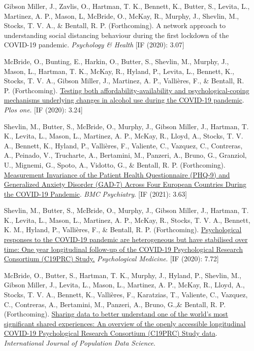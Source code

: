 \documentclass[12pt]{article}
\begin{document}
\begin{bibenum}
\item Gibson Miller, J., Zavlis, O., Hartman, T. K., Bennett, K., Butter, S., Levita, L., Martinez, A. P., Mason, L, McBride, O., McKay, R., Murphy, J., 
	Shevlin, M., Stocks, T. V. A., \& Bentall, R. P. (Forthcoming). A network approach to understanding social distancing behaviour during the first lockdown of the COVID-19 pandemic. \textit{Psychology \& Health} [IF (2020): 3.07]

\item McBride, O., Bunting, E., Harkin, O., Butter, S.,  Shevlin, M., Murphy, J., Mason, L., Hartman, T. K., McKay, R., Hyland, P., Levita, L.,  Bennett, K., Stocks, T. V. A., Gibson Miller, J., Martinez, A. P., Vallières, F., \& Bentall, R. P. (Forthcoming). \href{https://psyarxiv.com/xby9r/}{Testing both affordability-availability and psychological-coping mechanisms underlying changes in alcohol use during the COVID-19 pandemic}.
	\emph{Plos one}. [IF (2020): 3.24]

\item Shevlin, M., Butter, S., McBride, O., Murphy, J., Gibson Miller, J., Hartman, T. K., Levita, L., Mason, L., Martinez, A. P., McKay, R., Lloyd, A., Stocks, T. V. A., Bennett, K., Hyland, P., Vallières, F., Valiente, C., Vazquez, C., Contreras, A., Peinado, V., Trucharte, A., Bertamini, M., Panzeri, A., Bruno, G., Granziol, U., Mignemi, G., Spoto, A., Vidotto, G., \& Bentall, R. P. (Forthcoming). \href{https://psyarxiv.com/fwga8/}{Measurement Invariance of the Patient Health Questionnaire (PHQ-9) and Generalized Anxiety Disorder (GAD-7) Across Four European Countries During the COVID-19 Pandemic}. 
	\emph{BMC Psychiatry}. [IF (2021): 3.63]


	\item Shevlin, M., Butter, S., McBride, O., Murphy, J., Gibson Miller, J., Hartman, T. K.,
	Levita, L., Mason, L., Martinez, A. P.,  
	McKay, R., Stocks, T. V. A., Bennett, K. M.,  Hyland, P., Vallières, F., \& Bentall, R. P. (Forthcoming). 
		\href{https://psyarxiv.com/42dfu/}
		{Psychological responses to the COVID-19 pandemic are heterogeneous but have stabilised over time: 
		One year longitudinal follow-up of the COVID-19 Psychological Research Consortium (C19PRC) Study.}
		\emph{Psychological Medicine}. [IF (2020): 7.72]
		
\item McBride, O., Butter, S., Hartman, T. K., Murphy, J., Hyland, P., Shevlin, M., Gibson Miller, J.,  Levita, L., Mason, L., Martinez, A. P., McKay, R., Lloyd, A., Stocks, T. V. A., Bennett, K., Vallières, F., Karatzias, T., Valiente, C., Vazquez, C., Contreras, A., Bertamini, M., Panzeri, A., Bruno, G.,\& Bentall, R. P. (Forthcoming). \href{}{Sharing data to better understand one of the world’s most significant shared experiences: An overview of the openly accessible longitudinal COVID-19 Psychological Research Consortium (C19PRC) Study data}. 
	\emph{International Journal of Population Data Science}.


\end{bibenum}
\end{document}
